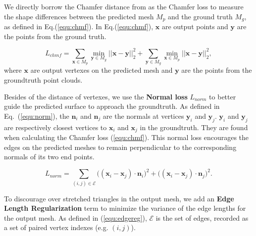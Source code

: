 We directly borrow the Chamfer distance from \cite{PSGN} as the Chamfer loss to measure the shape differences between the predicted mesh $M_p$ and the ground truth  $M_g$, as defined in Eq.(\ref{equ:chmf}).
%
In Eq.(\ref{equ:chmf}), $\mathbf{x}$ are output points and $\mathbf{y}$ are the points from the ground truth.

\begin{equation}
\label{equ:chmf}
L_{chmf} = \sum_{\mathbf{x}\in M_p} \min_{\mathbf{y} \in M_g}||\mathbf{x}-\mathbf{y}||_2^2 + 
\sum_{\mathbf{y} \in M_g} \min_{\mathbf{x}\in M_p}||\mathbf{x}-\mathbf{y}||_2^2,
\end{equation}
where $\mathbf{x}$ are output vertexes on the predicted mesh and $\mathbf{y}$ are the points from the groundtruth point clouds.


Besides of the distance of vertexes, we use the {\textbf{Normal loss}} $L_{norm}$ to better guide the predicted surface to approach the groundtruth.
As defined in Eq.~(\ref{equ:norm}), the $\mathbf{n}_{i}$ and $\mathbf{n}_{j}$ are the normals at vertices $\mathbf{y}_i$ and $\mathbf{y}_j$. 
$\mathbf{y}_i$ and $\mathbf{y}_j$ are respectively closest vertices to $\mathbf{x}_i$ and $\mathbf{x}_j$ in the groundtruth. 
They are found when calculating the Chamfer loss (\ref{equ:chmf}). 
This normal loss encourages the edges on the predicted meshes to remain perpendicular to the corresponding normals of its two end points.

\begin{equation}
\label{equ:norm}
L_{norm} = \sum_{(i,j)\in\mathcal{E}}\big((\mathbf{x}_i-\mathbf{x}_j)\cdot\mathbf{n}_{i}\big)^2 + \big( (\mathbf{x}_i-\mathbf{x}_j)\cdot \mathbf{n}_j\big)^2.
\end{equation}

To discourage over stretched triangles in the output mesh, we add an \textbf{Edge Length Regularization} term to minimize the variance of the edge lengths for the output mesh.
As defined in (\ref{equ:edgereg}), $\mathcal{E}$ is the set of edges, recorded as a set of paired vertex indexes (e.g. $(i,j)$).

